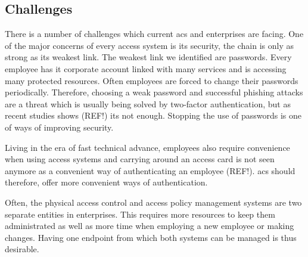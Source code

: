 \subsection{Challenges} \label{challenges}

There is a number of challenges which current \acrlong{acs} and enterprises are facing. One of the major concerns of every access system is its security, the chain is only as strong as its weakest link. The weakest link we identified are passwords. Every employee has it corporate account linked with many services and is accessing many protected resources. Often employees are forced to change their passwords periodically. Therefore, choosing a weak password and successful phishing attacks are a threat which is usually being solved by two-factor authentication, but as recent studies shows (REF!) its not enough. Stopping the use of passwords is one of ways of improving security.

Living in the era of fast technical advance, employees also require convenience when using access systems and carrying around an access card is not seen anymore as a convenient way of authenticating an employee (REF!). \acrshort{acs} should therefore, offer more convenient ways of authentication.

Often, the physical access control and access policy management systems are two separate entities in enterprises. This requires more resources to keep them administrated as well as more time when employing a new employee or making changes. Having one endpoint from which both systems can be managed is thus desirable.
